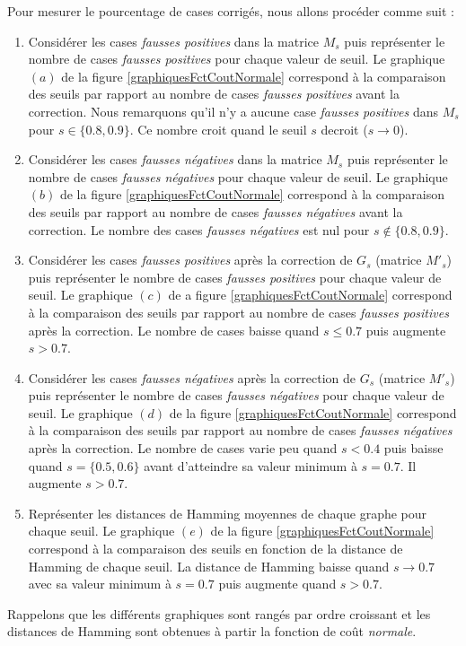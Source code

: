 
Pour mesurer le pourcentage de cases corrig\'es, nous allons proc\'eder comme suit :
\begin{enumerate}[label = (\alph*)]
	\item Consid\'erer les cases {\em fausses positives} dans la matrice $M_s$ puis repr\'esenter le nombre de cases {\em fausses positives} pour chaque valeur de seuil. 
	Le graphique $(a)$ de la figure \ref{graphiquesFctCoutNormale} correspond \`a  la comparaison des seuils par rapport au nombre de cases {\em fausses positives} avant la correction.
	Nous remarquons qu'il n'y a aucune case {\em fausses positives} dans $M_s$ pour $s\in\{0.8,0.9\}$. Ce nombre croit quand le seuil $s$ decroit ($s \rightarrow 0$).
	
	\item Consid\'erer les cases {\em fausses n\'egatives} dans la matrice $M_s$ puis repr\'esenter le nombre de cases {\em fausses n\'egatives} pour chaque valeur de seuil.  Le graphique $(b)$ de la figure \ref{graphiquesFctCoutNormale}  correspond \`a la comparaison des seuils par rapport au nombre de cases {\em fausses n\'egatives} avant la correction. Le nombre des cases {\em fausses n\'egatives} est nul pour $s \not \in \{0.8,0.9\}$. 

	\item Consid\'erer les cases {\em fausses positives} apr\`es la correction de $G_s$ (matrice $M'_s$) puis repr\'esenter le nombre de cases {\em fausses positives} pour chaque valeur de seuil. Le graphique $(c)$ de a figure \ref{graphiquesFctCoutNormale} correspond \`a  la comparaison des seuils par rapport au nombre de cases {\em fausses positives} apr\`es la correction.
	 Le nombre de cases baisse quand $s \le 0.7$ puis augmente $s>0.7$.
	 
	\item Consid\'erer les cases {\em fausses n\'egatives} apr\`es la correction de $G_s$ (matrice $M'_s$) puis repr\'esenter le nombre de cases {\em fausses n\'egatives} pour chaque valeur de seuil. Le graphique $(d)$ de la figure \ref{graphiquesFctCoutNormale} correspond \`a la comparaison des seuils par rapport au nombre de cases {\em fausses n\'egatives} apr\`es la correction. Le nombre de cases varie peu quand $s < 0.4$ puis baisse quand $s = \{0.5, 0.6\}$ avant d'atteindre sa valeur minimum \`a $s = 0.7$. Il augmente $s>0.7$.
	
	\item Repr\'esenter les distances de Hamming moyennes de chaque graphe pour chaque seuil. Le graphique $(e)$ de la figure \ref{graphiquesFctCoutNormale} correspond \`a la comparaison des seuils en fonction de la distance de Hamming de chaque seuil.
	La distance de Hamming baisse quand $s \rightarrow 0.7$ avec sa valeur minimum \`a $s = 0.7$ puis augmente quand $s > 0.7$. 
\end{enumerate}
Rappelons que les diff\'erents graphiques sont rang\'es par ordre croissant et 
les distances de Hamming sont obtenues \`a partir la fonction de co\^ut {\em normale}.

